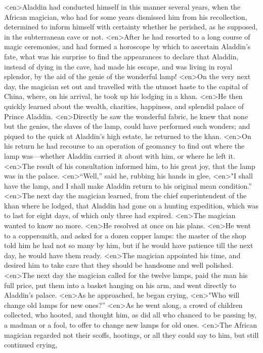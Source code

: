 <en>Aladdin had conducted himself in this manner several years, when the African magician, who had for some years dismissed him from his recollection, determined to inform himself with certainty whether he perished, as he supposed, in the subterranean cave or not.
<en>After he had resorted to a long course of magic ceremonies, and had formed a horoscope by which to ascertain Aladdin’s fate, what was his surprise to find the appearances to declare that Aladdin, instead of dying in the cave, had made his escape, and was living in royal splendor, by the aid of the genie of the wonderful lamp!
<en>On the very next day, the magician set out and travelled with the utmost haste to the capital of China, where, on his arrival, he took up his lodging in a khan.
<en>He then quickly learned about the wealth, charities, happiness, and splendid palace of Prince Aladdin.
<en>Directly he saw the wonderful fabric, he knew that none but the genies, the slaves of the lamp, could have performed such wonders; and piqued to the quick at Aladdin’s high estate, he returned to the khan.
<en>On his return he had recourse to an operation of geomancy to find out where the lamp was—whether Aladdin carried it about with him, or where he left it.
<en>The result of his consultation informed him, to his great joy, that the lamp was in the palace.
<en>“Well,” said he, rubbing his hands in glee,
<en>"I shall have the lamp, and I shall make Aladdin return to his original mean condition.”
<en>The next day the magician learned, from the chief superintendent of the khan where he lodged, that Aladdin had gone on a hunting expedition, which was to last for eight days, of which only three had expired.
<en>The magician wanted to know no more.
<en>He resolved at once on his plans.
<en>He went to a coppersmith, and asked for a dozen copper lamps: the master of the shop told him he had not so many by him, but if he would have patience till the next day, he would have them ready.
<en>The magician appointed his time, and desired him to take care that they should be handsome and well polished.
<en>The next day the magician called for the twelve lamps, paid the man his full price, put them into a basket hanging on his arm, and went directly to Aladdin’s palace.
<en>As he approached, he began crying,
<en>"Who will change old lamps for new ones?”
<en>As he went along, a crowd of children collected, who hooted, and thought him, as did all who chanced to be passing by, a madman or a fool, to offer to change new lamps for old ones.
<en>The African magician regarded not their scoffs, hootings, or all they could say to him, but still continued crying,
